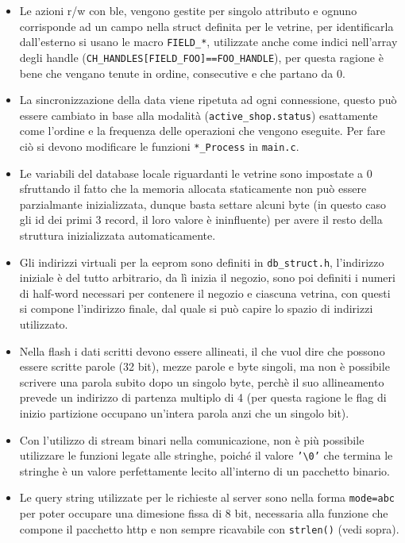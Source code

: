 \begin{itemize}
\item Le azioni r/w con ble, vengono gestite per singolo attributo e ognuno corrisponde ad un campo nella struct definita per le vetrine, per identificarla dall'esterno si usano le macro \texttt{FIELD\_*}, utilizzate anche come indici nell'array degli handle (\texttt{CH\_HANDLES[FIELD\_FOO]==FOO\_HANDLE}), per questa ragione \`e bene che vengano tenute in ordine, consecutive e che partano da 0.
\item La sincronizzazione della data viene ripetuta ad ogni connessione, questo pu\`o essere cambiato in base alla modalit\`a (\texttt{active\_shop.status}) esattamente come l'ordine e la frequenza delle operazioni che vengono eseguite. Per fare ci\`o si devono modificare le funzioni \texttt{*\_Process} in \texttt{main.c}.
\item Le variabili del database locale riguardanti le vetrine sono impostate a 0 sfruttando il fatto che la memoria allocata staticamente non pu\`o essere parzialmante inizializzata, dunque basta settare alcuni byte (in questo caso gli id dei primi 3 record, il loro valore \`e ininfluente) per avere il resto della struttura inizializzata automaticamente.
\item Gli indirizzi virtuali per la eeprom sono definiti in \texttt{db\_struct.h}, l'indirizzo iniziale \`e del tutto arbitrario, da lì inizia il negozio, sono poi definiti i numeri di half-word necessari per contenere il negozio e ciascuna vetrina, con questi si compone l'indirizzo finale, dal quale si pu\`o capire lo spazio di indirizzi utilizzato.
\item Nella flash i dati scritti devono essere allineati, il che vuol dire che possono essere scritte parole (32 bit), mezze parole e byte singoli, ma non è possibile scrivere una parola subito dopo un singolo byte, perch\`e il suo allineamento prevede un indirizzo di partenza multiplo di 4 (per questa ragione le flag di inizio partizione occupano un'intera parola anzi che un singolo bit).
\item Con l'utilizzo di stream binari nella comunicazione, non \`e pi\`u possibile utilizzare le funzioni legate alle stringhe, poich\'e il valore \texttt{'\textbackslash 0'} che termina le stringhe \`e un valore perfettamente lecito all'interno di un pacchetto binario.
\item Le query string utilizzate per le richieste al server sono nella forma \texttt{mode=abc} per poter occupare una dimesione fissa di 8 bit, necessaria alla funzione che compone il pacchetto http e non sempre ricavabile con \texttt{strlen()} (vedi sopra).

\end{itemize}
